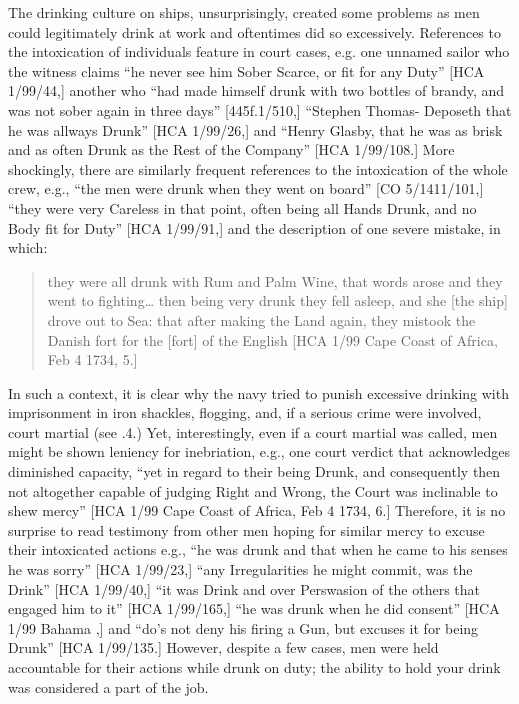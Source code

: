   The drinking culture on ships, unsurprisingly, created some problems as men could legitimately drink at work and oftentimes did so excessively. References to the intoxication of individuals feature in court cases, e.g. one unnamed sailor who the witness claims “he never see him Sober Scarce, or fit for any Duty” [HCA 1/99/44,] another who “had made himself drunk with two bottles of brandy, and was not sober again in three days” [445f.1/510,] “Stephen Thomas- Deposeth that he was allways Drunk” [HCA 1/99/26,] and “Henry Glasby, that he was as brisk and as often Drunk as the Rest of the Company” [HCA 1/99/108.] More shockingly, there are similarly frequent references to the intoxication of the whole crew, e.g., “the men were drunk when they went on board” [CO 5/1411/101,] “they were very Careless in that point, often being all Hands Drunk, and no Body fit for Duty” [HCA 1/99/91,] and the description of one severe mistake, in which: 

\begin{quotation}
they were all drunk with Rum and Palm Wine, that words arose and they went to fighting… then being very drunk they fell asleep, and she [the ship] drove out to Sea: that after making the Land again, they mistook the Danish fort for the [fort] of the English [HCA 1/99 Cape Coast of Africa, Feb 4 1734, 5.]\end{quotation}

In such a context, it is clear why the navy tried to punish excessive drinking with imprisonment in iron shackles, flogging, and, if a serious crime were involved, court martial (see .4.) Yet, interestingly, even if a court martial was called, men might be shown leniency for inebriation, e.g., one court verdict that acknowledges diminished capacity, “yet in regard to their being Drunk, and consequently then not altogether capable of judging Right and Wrong, the Court was inclinable to shew mercy” [HCA 1/99 Cape Coast of Africa, Feb 4 1734, 6.] Therefore, it is no surprise to read testimony from other men hoping for similar mercy to excuse their intoxicated actions e.g., “he was drunk and that when he came to his senses he was sorry” [HCA 1/99/23,] “any Irregularities he might commit, was the Drink” [HCA 1/99/40,] “it was Drink and over Perswasion of the others that engaged him to it” [HCA 1/99/165,] “he was drunk when he did consent” [HCA 1/99 Bahama \citealt{Islands1722},] and “do’s not deny his firing a Gun, but excuses it for being Drunk” [HCA 1/99/135.] However, despite a few cases, men were held accountable for their actions while drunk on duty; the ability to hold your drink was considered a part of the job. 

